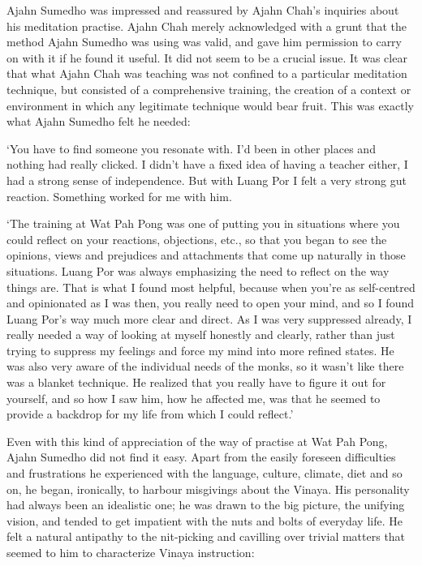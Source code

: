 Ajahn Sumedho was impressed and reassured by Ajahn Chah's inquiries
about his meditation practise. Ajahn Chah merely acknowledged with a
grunt that the method Ajahn Sumedho was using was valid, and gave him
permission to carry on with it if he found it useful. It did not seem to
be a crucial issue. It was clear that what Ajahn Chah was teaching was
not confined to a particular meditation technique, but consisted of a
comprehensive training, the creation of a context or environment in
which any legitimate technique would bear fruit. This was exactly what
Ajahn Sumedho felt he needed: 

`You have to find someone you resonate with. I'd been in other places
and nothing had really clicked. I didn't have a fixed idea of having a
teacher either, I had a strong sense of independence. But with Luang Por
I felt a very strong gut reaction. Something worked for me with him. 

`The training at Wat Pah Pong was one of putting you in situations where
you could reflect on your reactions, objections, etc., so that you began
to see the opinions, views and prejudices and attachments that come up
naturally in those situations. Luang Por was always emphasizing the need
to reflect on the way things are. That is what I found most helpful, 
because when you're as self-centred and opinionated as I was then, you
really need to open your mind, and so I found Luang Por's way much more
clear and direct. As I was very suppressed already, I really needed a
way of looking at myself honestly and clearly, rather than just trying
to suppress my feelings and force my mind into more refined states. He
was also very aware of the individual needs of the monks, so it wasn't
like there was a blanket technique. He realized that you really have to
figure it out for yourself, and so how I saw him, how he affected me, 
was that he seemed to provide a backdrop for my life from which I could
reflect.'

Even with this kind of appreciation of the way of practise at Wat Pah
Pong, Ajahn Sumedho did not find it easy. Apart from the easily foreseen
difficulties and frustrations he experienced with the language, culture, 
climate, diet and so on, he began, ironically, to harbour misgivings
about the Vinaya. His personality had always been an idealistic one; he
was drawn to the big picture, the unifying vision, and tended to get
impatient with the nuts and bolts of everyday life. He felt a natural
antipathy to the nit-picking and cavilling over trivial matters that
seemed to him to characterize Vinaya instruction: 

